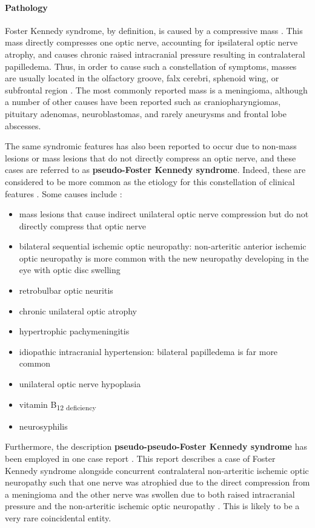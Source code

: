 \paragraph{Pathology}

Foster Kennedy syndrome, by definition, is caused by a compressive mass . This mass directly compresses one optic nerve, accounting for ipsilateral optic nerve atrophy, and causes chronic raised intracranial pressure resulting in contralateral papilledema. Thus, in order to cause such a constellation of symptoms, masses are usually located in the olfactory groove, falx cerebri, sphenoid wing, or subfrontal region . The most commonly reported mass is a meningioma, although a number of other causes have been reported such as craniopharyngiomas, pituitary adenomas, neuroblastomas, and rarely aneurysms and frontal lobe abscesses.

The same syndromic features has also been reported to occur due to non-mass lesions or mass lesions that do not directly compress an optic nerve, and these cases are referred to as \textbf{pseudo-Foster Kennedy syndrome}. Indeed, these are considered to be more common as the etiology for this constellation of clinical features . Some causes include :

\begin{itemize}
	\item
	mass lesions that cause indirect unilateral optic nerve compression but do not directly compress that optic nerve
	\item
	bilateral sequential ischemic optic neuropathy: non-arteritic anterior ischemic optic neuropathy is more common with the new neuropathy developing in the eye with optic disc swelling
	\item
	retrobulbar optic neuritis
	\item
	chronic unilateral optic atrophy
	\item
	hypertrophic pachymeningitis
	\item
	idiopathic intracranial hypertension: bilateral papilledema is far more common
	\item
	unilateral optic nerve hypoplasia
	\item
	vitamin B\textsubscript{12 deficiency}
	\item
	neurosyphilis
\end{itemize}

Furthermore, the description \textbf{pseudo-pseudo-Foster Kennedy syndrome} has been employed in one case report . This report describes a case of Foster Kennedy syndrome alongside concurrent contralateral non-arteritic ischemic optic neuropathy such that one nerve was atrophied due to the direct compression from a meningioma and the other nerve was swollen due to both raised intracranial pressure and the non-arteritic ischemic optic neuropathy . This is likely to be a very rare coincidental entity.

